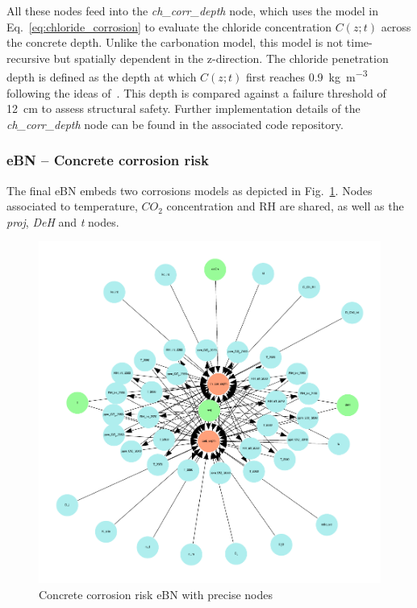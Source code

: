 All these nodes feed into the \textit{ch\_corr\_depth} node, which uses the model in Eq.~\ref{eq:chloride_corrosion} to evaluate the chloride concentration $C(z;t)$ across the concrete depth. 
Unlike the carbonation model, this model is not time-recursive but spatially dependent in the z-direction. The chloride penetration depth is defined as the depth at which $C(z;t)$ first reaches \SI{0.9}{\kilogram\per\cubic\meter} following the ideas of~\textcite{fuma}.
This depth is compared against a failure threshold of \SI{12}{\centi\meter} to assess structural safety.
Further implementation details of the \textit{ch\_corr\_depth} node can be found in the associated code repository.

\subsubsection{eBN -- Concrete corrosion risk}
The final eBN embeds two corrosions models as depicted in Fig.~\ref{fig:precise_ebn}. Nodes associated to temperature, $CO_2$ concentration and RH are shared, as well as the \textit{proj}, \textit{DeH} and \textit{t} nodes. 

\begin{figure}[]
    \centering
    \includegraphics[width=\linewidth]{imgs/pdfs/12_total_ebn_precise.pdf}
    \caption{Concrete corrosion risk eBN with precise nodes}\label{fig:precise_ebn}
\end{figure}

